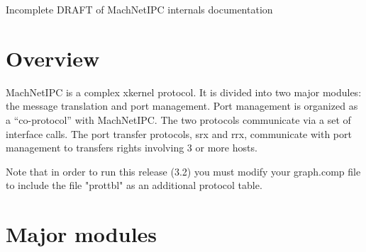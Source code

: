 

\large{Incomplete DRAFT of MachNetIPC internals documentation}

\section{Overview}
MachNetIPC is a complex xkernel protocol.  It is divided into two
major modules: the message translation and port management.  Port
management is organized as a ``co-protocol'' with MachNetIPC.  The
two protocols communicate via a set of interface calls.  The port
transfer protocols, srx and rrx, communicate with port management
to transfers rights involving 3 or more hosts.

Note that in order to run this release (3.2) you must modify
your graph.comp file to include the file "prottbl" as an
additional protocol table.

\section{Major modules}

